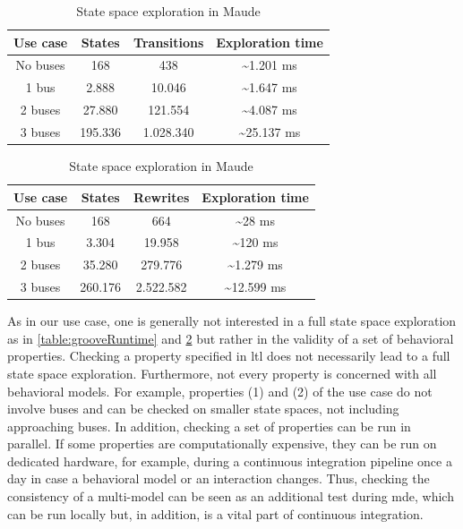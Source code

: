 \documentclass{jot}
\begin{document}
\begin{table}[ht]
\centering

\begin{tabular}{|c || c | c | c |}
 \hline
 Use case & States & Transitions & Exploration time \\
 \hline\hline
 No buses & 168 & 438 & \textasciitilde 1.201 ms \\
 \hline
 1 bus & 2.888 & 10.046 & \textasciitilde 1.647 ms \\
 \hline
 2 buses & 27.880 & 121.554 & \textasciitilde 4.087 ms \\
 \hline
 3 buses & 195.336 & 1.028.340 & \textasciitilde 25.137 ms \\
 \hline
\end{tabular}
\caption[State space exploration in Groove]{State space exploration in Groove}
\label{table:grooveRuntime}

\smallskip

\begin{tabular}{|c || c | c | c |}
 \hline
 Use case & States & Rewrites & Exploration time \\
 \hline\hline
 No buses & 168 & 664 & \textasciitilde 28 ms \\
 \hline
 1 bus & 3.304 & 19.958 & \textasciitilde 120 ms \\
 \hline
 2 buses & 35.280 & 279.776 & \textasciitilde 1.279 ms \\
 \hline
 3 buses & 260.176 & 2.522.582 & \textasciitilde 12.599 ms \\
 \hline
\end{tabular}
\caption[State space exploration in Maude]{State space exploration in Maude}
\label{table:maudeRuntime}

\end{table}

As in our use case, one is generally not interested in a full state space exploration as in \cref{table:grooveRuntime} and \cref{table:maudeRuntime} but rather in the validity of a set of behavioral properties.
Checking a property specified in \gls*{ltl} does not necessarily lead to a full state space exploration.
Furthermore, not every property is concerned with all behavioral models.
For example, properties (1) and (2) of the use case do not involve buses and can be checked on smaller state spaces, not including approaching buses.
In addition, checking a set of properties can be run in parallel.
If some properties are computationally expensive, they can be run on dedicated hardware, for example, during a continuous integration pipeline once a day in case a behavioral model or an interaction changes.
Thus, checking the consistency of a multi-model can be seen as an additional test during \gls*{mde}, which can be run locally but, in addition, is a vital part of continuous integration.
\end{document}
